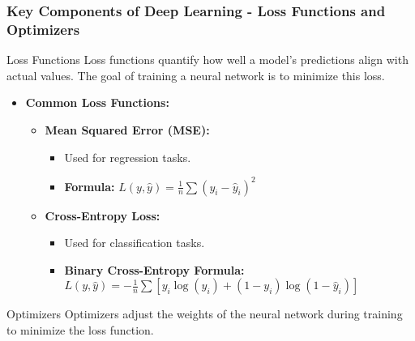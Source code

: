 \documentclass[aspectratio=169]{beamer}
\begin{document}
\begin{frame}[fragile]
    \frametitle{Key Components of Deep Learning - Loss Functions and Optimizers}
    
    \begin{block}{Loss Functions}
        Loss functions quantify how well a model's predictions align with actual values. The goal of training a neural network is to minimize this loss.
    \end{block}
    
    \begin{itemize}
        \item \textbf{Common Loss Functions:}
        \begin{itemize}
            \item \textbf{Mean Squared Error (MSE):} 
                \begin{itemize}
                    \item Used for regression tasks.
                    \item \textbf{Formula:} \( L(y, \hat{y}) = \frac{1}{n} \sum (y_i - \hat{y}_i)^2 \)
                \end{itemize}
            \item \textbf{Cross-Entropy Loss:} 
                \begin{itemize}
                    \item Used for classification tasks.
                    \item \textbf{Binary Cross-Entropy Formula:} \( L(y, \hat{y}) = -\frac{1}{n} \sum [y_i \log(\hat{y}_i) + (1 - y_i) \log(1 - \hat{y}_i)] \)
                \end{itemize}
        \end{itemize}
    \end{itemize}

    \begin{block}{Optimizers}
        Optimizers adjust the weights of the neural network during training to minimize the loss function.
    \end{block}


\end{frame}
\end{document}
